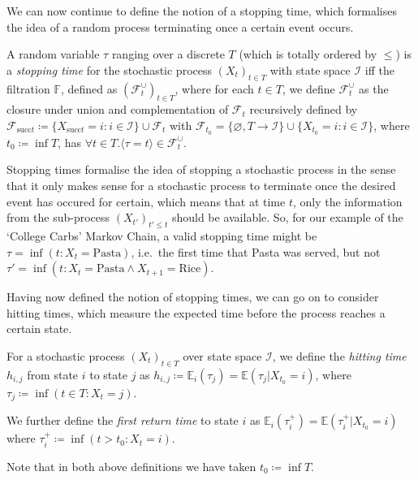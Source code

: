 		We can now continue to define the notion of a stopping time, which formalises the idea of 
		a random process terminating once a certain event occurs.
		\begin{definition}
			A random variable $\tau$ ranging over a discrete $T$ (which is totally ordered by 
			$\leq$) is a \emph{stopping time} for the stochastic process $(X_t)_{t \in T}$ with state 
			space $\mathcal{I}$ iff the filtration $\mathbb{F}$, defined as 
			$(\mathcal{F}^{\cup}_t)_{t \in T}$, where 
			for each $t \in T$, we define $\mathcal{F}^\cup_t$ as the closure under union and 
			complementation of $\mathcal{F}_t$ recursively defined by 
			$\mathcal{F}_{\mathrm{succ} t} \coloneqq \{X_{\mathrm{succ} t} = i : i \in \mathcal{I}\} 
			\cup \mathcal{F}_t$ with $\mathcal{F}_{t_0} = \{\varnothing, T\rightarrow\mathcal{I}\} 
			\cup \{X_{t_0} = i : {i} \in \mathcal{I}\}$, where $t_0 \coloneqq \inf T$, 
			has $\forall t \in T. \langle\tau = t\rangle \in \mathcal{F}^{\cup}_t.$
		\end{definition}
		\begin{comment}
			In layman's terms, this mouthful simply means that the event $\tau = t$ only depends on the
			variables $X_{t'}$ for $t' \leq t$.
		\end{comment}
		Stopping times formalise the idea of stopping a stochastic process in the sense that it only makes 
		sense for a stochastic process to terminate once the desired event has occured for certain, which
		means that at time $t$, only the information from the sub-process $(X_{t'})_{t' \leq t}$ should be
		available. So, for our example of the `College Carbs' Markov Chain, a valid stopping time might be
		$\tau = \inf(t : X_t = \mathrm{Pasta})$, i.e.\ the first time that Pasta was 
		served, but not $\tau'= \inf(t : X_t=\mathrm{Pasta}\land X_{t+1}=\mathrm{Rice})$.
		\par
		Having now defined the notion of stopping times, we can go on to consider hitting times, which 
		measure the expected time before the process reaches a certain state.
		\begin{definition}
			For a stochastic process $(X_t)_{t \in T}$ over state space $\mathcal{I}$, we define the 
			\emph{hitting time} $h_{i,j}$ from state $i$ to state $j$ as $h_{i,j} \coloneqq 
			\mathbb{E}_i(\tau_j) = \mathbb{E}(\tau_j | X_{t_0} = i)$, where $\tau_j \coloneqq 
			\inf(t \in T : X_t = j)$. \par
			We further define the \emph{first return time} to state $i$ as $\mathbb{E}_i(\tau_i^+) = 
			\mathbb{E}(\tau_i^+ | X_{t_0} = i)$ where $\tau_i^+ \coloneqq \inf(t > t_0 : X_t = i)$.
			\par
			Note that in both above definitions we have taken $t_0 \coloneqq \inf T$.
		\end{definition}
		
